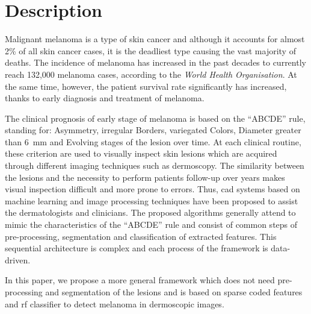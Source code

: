\graphicspath{ {./content/intro/figures/} }

\section{Description}
\label{sec:descr}  %
Malignant melanoma is a type of skin cancer and although it accounts for almost 2\% of all skin cancer
cases, it is the deadliest type causing the vast majority of deaths. 
The incidence of melanoma has increased in the past decades to currently reach 132,000 melanoma cases, according to the \textit{World Health Organisation}.
At the same time, however, the patient survival rate significantly has increased, thanks to early diagnosis and treatment of melanoma.

The clinical prognosis of early stage of melanoma is based on the ``ABCDE'' rule, standing for: Asymmetry, irregular Borders, variegated Colors, Diameter greater than \SI{6}{\milli \meter} and Evolving stages of the lesion over time.
At each clinical routine, these criterion are used to visually inspect skin lesions which are acquired through different imaging techniques such as dermoscopy.
The similarity between the lesions and the necessity to perform patients follow-up over years makes visual inspection difficult and more prone to errors.
Thus, \ac{cad} systems based on machine learning and image processing techniques have been proposed to assist the dermatologists and clinicians. 
The proposed algorithms generally attend to mimic the characteristics of the ``ABCDE'' rule and consist of common steps of pre-processing, segmentation and classification of extracted features. 
This sequential architecture is complex and each process of the framework is data-driven. 

In this paper, we propose a more general framework which does not need pre-processing and segmentation of the lesions and is based on sparse coded features and \ac{rf} classifier to detect melanoma in dermoscopic images.



